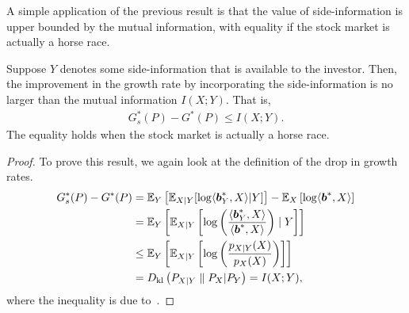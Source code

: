     A simple application of the previous result is that the value of side-information is upper bounded by the mutual information, with equality if the stock market is actually a horse race. 
    \begin{corollary}
        \label{corollary:side-info-stock}
        Suppose $Y$ denotes some side-information that is available to the investor. Then, the improvement in the growth rate by incorporating the side-information is no larger than the mutual information $I(X;Y)$. That is, 
        \begin{align}
            G^*_s(P) - G^*(P) \leq I(X;Y). 
        \end{align}
        The equality holds when the stock market is actually a horse race. 
    \end{corollary}
    \begin{proof}
        To prove this result, we again look at the definition of the drop in growth rates. 
        \begin{align}
            G^*_s(P) - G^*(P) &= \mathbb{E}_{Y}\left[ \mathbb{E}_{X|Y}[\log \langle \boldsymbol{b}^*_Y, X \rangle | Y] \right] - \mathbb{E}_X \left[ \log \langle \boldsymbol{b}^*, X  \rangle \right]  \\
            &= \mathbb{E}_{Y}\left[ \mathbb{E}_{X|Y}\left[ \log \left( \frac{\langle \boldsymbol{b}^*_Y, X \rangle}{\langle \boldsymbol{b}^*, X  \rangle} \right) \mid Y \right] \right]  \\
             &\leq \mathbb{E}_Y \left[ \mathbb{E}_{X|Y} \left[ \log \left( \frac{p_{X|Y}(X)}{p_{X}(X)} \right) \right]  \right] \\
             & = D_{\text{kl}} \left( P_{X|Y} \parallel P_X | P_Y \right) = I(X;Y), 
        \end{align}
        where the inequality is due to~. 
    \end{proof}
